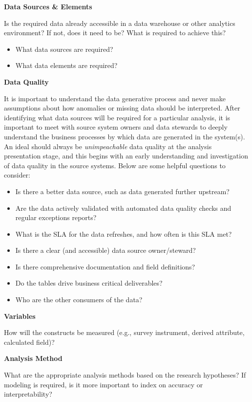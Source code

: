 \documentclass[
]{book}
\providecommand{\tightlist}{%
  \setlength{\itemsep}{0pt}\setlength{\parskip}{0pt}}
\begin{document}
\textbf{Data Sources \& Elements}

Is the required data already accessible in a data warehouse or other analytics environment? If not, does it need to be? What is required to achieve this?

\begin{itemize}
\tightlist
\item
  What data sources are required?
\item
  What data elements are required?
\end{itemize}

\textbf{Data Quality}

It is important to understand the data generative process and never make assumptions about how anomalies or missing data should be interpreted. After identifying what data sources will be required for a particular analysis, it is important to meet with source system owners and data stewards to deeply understand the business processes by which data are generated in the system(s). An ideal should always be \emph{unimpeachable} data quality at the analysis presentation stage, and this begins with an early understanding and investigation of data quality in the source systems. Below are some helpful questions to consider:

\begin{itemize}
\tightlist
\item
  Is there a better data source, such as data generated further upstream?
\item
  Are the data actively validated with automated data quality checks and regular exceptions reports?
\item
  What is the SLA for the data refreshes, and how often is this SLA met?
\item
  Is there a clear (and accessible) data source owner/steward?
\item
  Is there comprehensive documentation and field definitions?
\item
  Do the tables drive business critical deliverables?
\item
  Who are the other consumers of the data?
\end{itemize}

\textbf{Variables}

How will the constructs be measured (e.g., survey instrument, derived attribute, calculated field)?

\textbf{Analysis Method}

What are the appropriate analysis methods based on the research hypotheses? If modeling is required, is it more important to index on accuracy or interpretability?
\end{document}
